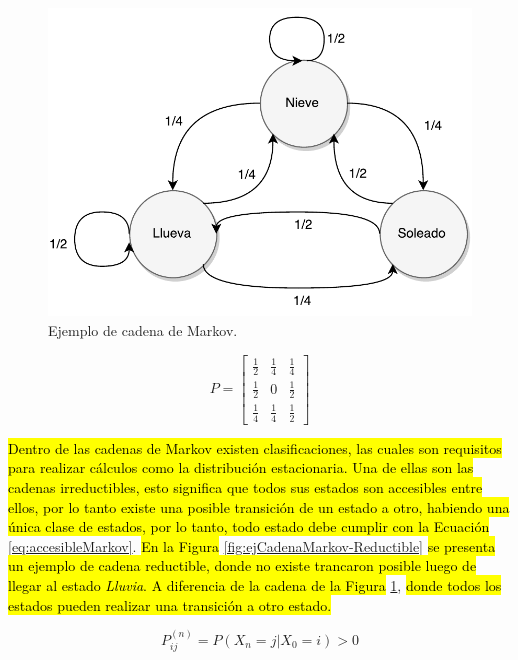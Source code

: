 \begin{figure}[ht!]
	\centering
	\includegraphics[scale=0.5]{images/EjCadenaMarkov.pdf}
	\caption{Ejemplo de cadena de Markov.}
	\label{fig:ejCadenaMarkov}
\end{figure}

\begin{equation} \label{eq:ejCadenaMarkov}
	P =
	\begin{bmatrix}
		\frac{1}{2} & \frac{1}{4} & \frac{1}{4} \\
		\frac{1}{2} & 0 & \frac{1}{2} \\
		\frac{1}{4} & \frac{1}{4} & \frac{1}{2}
	\end{bmatrix}	
\end{equation}

\hl{Dentro de las cadenas de Markov existen clasificaciones, las cuales son requisitos para realizar cálculos como la distribución estacionaria. Una de ellas son las cadenas irreductibles, esto significa que todos sus estados son accesibles entre ellos, por lo tanto existe una posible transición de un estado a otro, habiendo una única clase de estados, por lo tanto, todo estado debe cumplir con la Ecuación} \ref{eq:accesibleMarkov}. \hl{En la Figura} \ref{fig:ejCadenaMarkov-Reductible} \hl{se presenta un ejemplo de cadena reductible, donde no existe trancaron posible luego de llegar al estado \textit{Lluvia}. A diferencia de la cadena de la Figura} \ref{fig:ejCadenaMarkov}, \hl{donde todos los estados pueden realizar una transición a otro estado.}

\begin{equation} \label{eq:accesibleMarkov}
	P_{ij}^{(n)} = P(X_n = j | X_0 = i) > 0
\end{equation}

